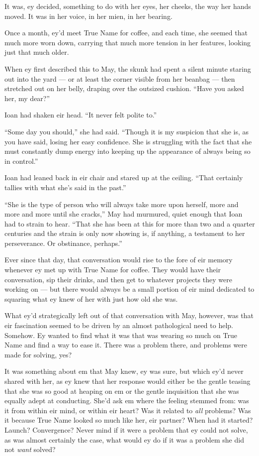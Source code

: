 It was, ey decided, something to do with her eyes, her cheeks, the way her hands moved. It was in her voice, in her mien, in her bearing.

Once a month, ey'd meet True Name for coffee, and each time, she seemed that much more worn down, carrying that much more tension in her features, looking just that much older.

When ey first described this to May, the skunk had spent a silent minute staring out into the yard — or at least the corner visible from her beanbag — then stretched out on her belly, draping over the outsized cushion. ``Have you asked her, my dear?''

Ioan had shaken eir head. ``It never felt polite to.''

``Some day you should,'' she had said. ``Though it is my suspicion that she is, as you have said, losing her easy confidence. She is struggling with the fact that she must constantly dump energy into keeping up the appearance of always being so in control.''

Ioan had leaned back in eir chair and stared up at the ceiling. ``That certainly tallies with what she's said in the past.''

``She is the type of person who will always take more upon herself, more and more and more until she cracks,'' May had murmured, quiet enough that Ioan had to strain to hear. ``That she has been at this for more than two and a quarter centuries and the strain is only now showing is, if anything, a testament to her perseverance. Or obstinance, perhaps.''

Ever since that day, that conversation would rise to the fore of eir memory whenever ey met up with True Name for coffee. They would have their conversation, sip their drinks, and then get to whatever projects they were working on — but there would always be a small portion of eir mind dedicated to squaring what ey knew of her with just how old she was.

What ey'd strategically left out of that conversation with May, however, was that eir fascination seemed to be driven by an almost pathological need to help. Somehow. Ey wanted to find what it was that was wearing so much on True Name and find a way to ease it. There was a problem there, and problems were made for solving, yes?

It was something about em that May knew, ey was sure, but which ey'd never shared with her, as ey knew that her response would either be the gentle teasing that she was so good at heaping on em or the gentle inquisition that she was equally adept at conducting. She'd ask em where the feeling stemmed from: was it from within eir mind, or within eir heart? Was it related to \emph{all} problems? Was it because True Name looked so much like her, eir partner? When had it started? Launch? Convergence? Never mind if it were a problem that ey could not solve, as was almost certainly the case, what would ey do if it was a problem she did not \emph{want} solved?

